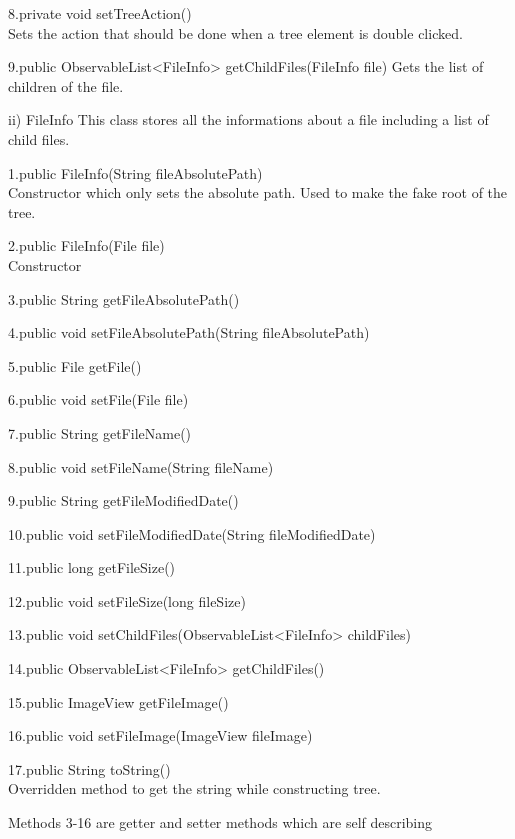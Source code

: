 \documentclass{article}
\begin{document}
\begin{class}
\begin{method}
			\item[8.private void setTreeAction()] ~\\Sets the action that should be done when a tree element is double clicked. 
			\item[9.public ObservableList<FileInfo> getChildFiles(FileInfo file)] Gets the list of children of the file.
		\end{method}
		\item[ii) FileInfo] \hfill \break
		This class stores all the informations about a file including a list of child files.
		\begin{method}
			\item[1.public FileInfo(String fileAbsolutePath)] ~\\Constructor which only sets the absolute path. Used to make the fake root of the tree.
			\item[2.public FileInfo(File file)] ~\\Constructor
			\item[3.public String getFileAbsolutePath()]
			\item[4.public void setFileAbsolutePath(String fileAbsolutePath)]
			\item[5.public File getFile()]
			\item[6.public void setFile(File file)]
			\item[7.public String getFileName()]
			\item[8.public void setFileName(String fileName)]
			\item[9.public String getFileModifiedDate()]
			\item[10.public void setFileModifiedDate(String fileModifiedDate)]
			\item[11.public long getFileSize()]
			\item[12.public void setFileSize(long fileSize)]
			\item[13.public void setChildFiles(ObservableList<FileInfo> childFiles)]
			\item[14.public ObservableList<FileInfo> getChildFiles()]
			\item[15.public ImageView getFileImage()]
			\item[16.public void setFileImage(ImageView fileImage)]
			\item[17.public String toString()] ~\\Overridden method to get the string while constructing tree.
			\item[Methods 3-16 are getter and setter methods which are self describing]
		\end{method}
	\end{class}
	
\end{document}
